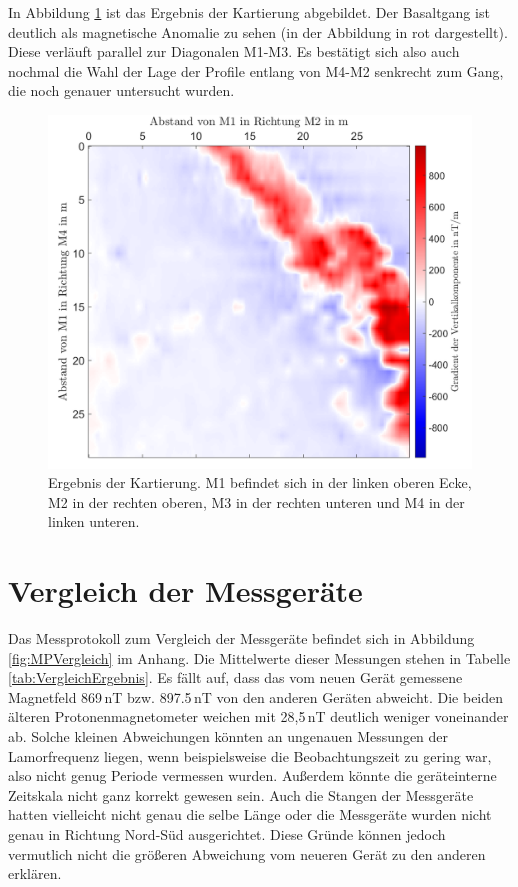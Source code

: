 In Abbildung \ref{fig:Kartierung} ist das Ergebnis der Kartierung abgebildet. Der Basaltgang ist deutlich als magnetische Anomalie zu sehen (in der Abbildung in rot dargestellt). Diese verläuft parallel zur Diagonalen M1-M3. Es bestätigt sich also auch nochmal die Wahl der Lage der Profile entlang von M4-M2 senkrecht zum Gang, die noch genauer untersucht wurden.

\begin{figure}[!ht]
 \centering
 \includegraphics[width=\textwidth]{fig/kartierung_verschwommen.png}
 \caption[Ergebnis der Kartierung]{Ergebnis der Kartierung. M1 befindet sich in der linken oberen Ecke, M2 in der rechten oberen, M3 in der rechten unteren und M4 in der linken unteren.}
 \label{fig:Kartierung}
\end{figure}

\section{Vergleich der Messgeräte}

Das Messprotokoll zum Vergleich der Messgeräte befindet sich in Abbildung \ref{fig:MPVergleich} im Anhang. Die Mittelwerte dieser Messungen stehen in Tabelle \ref{tab:VergleichErgebnis}. Es fällt auf, dass das vom neuen Gerät gemessene Magnetfeld 869\,nT bzw. 897.5\,nT von den anderen Geräten abweicht. Die beiden älteren Protonenmagnetometer weichen mit 28,5\,nT deutlich weniger voneinander ab. Solche kleinen Abweichungen könnten an ungenauen Messungen der Lamorfrequenz liegen, wenn beispielsweise die Beobachtungszeit zu gering war, also nicht genug Periode vermessen wurden. Außerdem könnte die geräteinterne Zeitskala nicht ganz korrekt gewesen sein. Auch die Stangen der Messgeräte hatten vielleicht nicht genau die selbe Länge oder die Messgeräte wurden nicht genau in Richtung Nord-Süd ausgerichtet. Diese Gründe können jedoch vermutlich nicht die größeren Abweichung vom neueren Gerät zu den anderen erklären.

